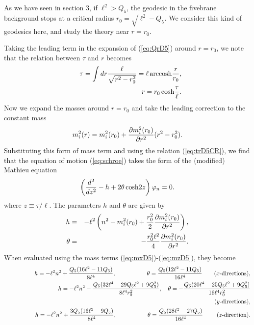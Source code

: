 \documentclass[a4paper,12pt]{article}
\begin{document}
As we have seen in section 3, if $\ell^2>Q_{5}$,
the geodesic in the fivebrane background stops at a critical 
radius $r_{0}=\sqrt{\ell^2-Q_{5}}$. 
We consider this kind of geodesics here, and
study the theory near $r=r_{0}$. 

Taking the leading term in the expansion of (\ref{eq:QrD5})
around $r=r_{0}$, we note that the relation between 
$\tau$ and $r$ becomes
\begin{eqnarray}
&&\tau =\int dr {\ell\over \sqrt{r^2-r_{0}^2}}
=\ell\, {\rm arccosh} {r\over r_{0}},\nonumber\\
&&r=r_{0}\,{\rm cosh }{\tau\over \ell}.
\label{eq:trD5CR}
\end{eqnarray}
Now we expand the masses around $r=r_{0}$ and take the 
leading correction to the constant mass
\begin{equation}
m^{2}_{i}(r)=m^{2}_{i}(r_0)+{\partial m^{2}_{i}(r_{0})\over 
\partial r^{2}} (r^2-r_{0}^2).
\label{eq:massexpand}
\end{equation}
Substituting this form of mass term and using the 
relation (\ref{eq:trD5CR}), we find that the equation of motion
(\ref{eq:schroe}) takes the 
form of the (modified) Mathieu equation \cite{Er}
\begin{equation}
\left({d^2\over dz^2}-h+2\theta \,{\rm cosh} 2z\right)\varphi_{n}=0.
\label{eq:mathieu}
\end{equation}
where $z\equiv\tau/\ell$.
The parameters $h$ and $\theta$ are given by 
\begin{eqnarray}
h&=&-\ell^2 \left(n^2 -m^{2}_{i}(r_0)
+{r_{0}^2\over 2}{\partial m^{2}_{i}(r_{0})\over 
\partial r^{2}}\right),\nonumber\\
\theta&=&-{r_{0}^2\ell^2\over 4}{\partial m^{2}_{i}(r_{0})
\over \partial r^{2}}.
\end{eqnarray}
When evaluated using the mass terms
(\ref{eq:mxD5})-(\ref{eq:mzD5}), they become
\begin{eqnarray}
&&h=-\ell^{2} n^{2} +{Q_{5} (16\ell^2-11 Q_{5})\over 
8\ell^4},\quad\hspace{1.5cm} \theta={Q_{5}(12\ell^2-11 Q_{5})\over 16 \ell^4}
\qquad\mbox{($x$-directions)},\nonumber\\
&&h=-\ell^{2} n^{2} -{Q_{5} (32\ell^{4}-29Q_{5}\ell^{2} 
+9 Q_{5}^{2})\over 8\ell^4 r_{0}^2},\quad 
\theta=-{Q_{5}(20\ell^{4}-25Q_{5}\ell^{2}+9 Q_{5}^{2})
\over 16 \ell^4 r_{0}^{2}}\nonumber\\
&&\qquad\hspace*{11.5cm}\mbox{($y$-directions)},\nonumber\\
&&h=-\ell^{2} n^{2} +{3 Q_{5} (16\ell^2-9 Q_{5})\over 
8\ell^4},\quad\hspace{1.5cm} 
\theta={Q_{5}(28\ell^2-27 Q_{5})\over 16 \ell^4}
\qquad\,\,\mbox{($z$-direction)}.\nonumber\\
\end{eqnarray}
\end{document}
